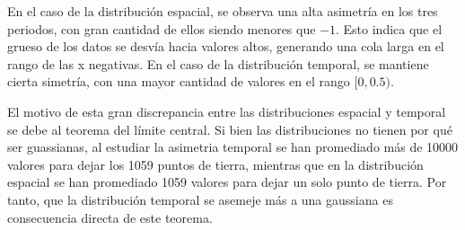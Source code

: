\documentclass[9pt,twocolumn,twoside]{opticajnl}
\begin{document}
En el caso de la distribución espacial, se observa una alta asimetría en los tres periodos, con gran cantidad de ellos siendo menores que $-1$. Esto indica que el grueso de los datos se desvía hacia valores altos, generando una cola larga en el rango de las x negativas. En el caso de la distribución temporal, se mantiene cierta simetría, con una mayor cantidad de valores en el rango $[0, 0.5)$. 

\begin{table}[h]
\centering
{}
\caption{Salida de código: número de puntos con cada valor de asimetría espacial de la temperatura.}
\label{tb:1}
\end{table}

\begin{table}[H]
\centering
{}
\caption{Salida de código: número de puntos con cada valor de asimetría temporal de la temperatura.}
\label{tb:2}
\end{table}

El motivo de esta gran discrepancia entre las distribuciones espacial y temporal se debe al teorema del límite central. Si bien las distribuciones no tienen por qué ser guassianas, al estudiar la asimetria temporal se han promediado más de 10000 valores para dejar los 1059 puntos de tierra, mientras que en la distribución espacial se han promediado 1059 valores para dejar un solo punto de tierra. Por tanto, que la distribución temporal se asemeje más a una gaussiana es consecuencia directa de este teorema.
\end{document}
